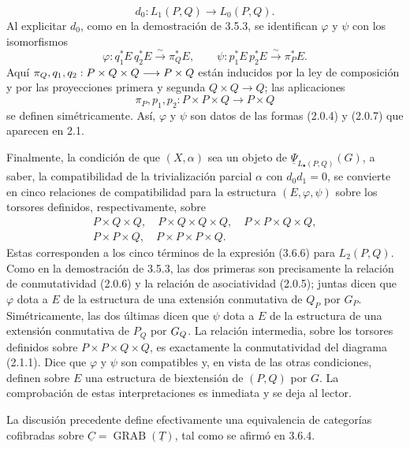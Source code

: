 
\[
 d_0:L_1(P,Q)\longrightarrow L_0(P,Q).
\]
Al explicitar $d_0$, como en la demostración de 3.5.3, se identifican
$\varphi$ y $\psi$ con los isomorfismos
\[
 \varphi:q_1^*E\,q_2^*E\xrightarrow{\sim}\pi_Q^*E,
 \qquad
 \psi:p_1^*E\,p_2^*E\xrightarrow{\sim}\pi_P^*E.
\]
Aquí $\pi_Q,\sisi{q_1q_2}{q_1,q_2}:P\times Q\times Q
\longrightarrow\sisi{Q}{P\times Q}$ están inducidos por la ley de
composición y por las proyecciones primera y segunda
$Q\times Q\longrightarrow Q$; las aplicaciones
\[
 \pi_P,p_1,p_2:P\times P\times Q\longrightarrow P\times Q
\]
se definen simétricamente. Así, $\varphi$ y $\psi$ son datos de las formas
(2.0.4) y (2.0.7) que aparecen en 2.1.

Finalmente, la condición de que $(X,\alpha)$ sea un objeto de
$\underline\Psi_{L_\bullet(P,Q)}(G)$, a saber, la compatibilidad de la
trivialización parcial $\alpha$ con $d_0d_1=0$, se convierte en cinco
relaciones de compatibilidad para la estructura $(E,\varphi,\psi)$ sobre
los torsores definidos, respectivamente, sobre
\[
\begin{gathered}
 P\times Q\times Q,\quad
 P\times Q\times Q\times Q,\quad
 P\times P\times Q\times Q,\\
 P\times P\times Q,\quad
 P\times P\times P\times Q.
\end{gathered}
\]
Estas corresponden a los cinco términos de la expresión (3.6.6) para
$L_2(P,Q)$. Como en la demostración de 3.5.3, las dos primeras son
precisamente la relación de conmutatividad (2.0.6) y la relación de
asociatividad (2.0.5); juntas dicen que $\varphi$ dota a $E$ de la
estructura de una extensión conmutativa de $Q_P$ por $G_P$.
Simétricamente, las dos últimas dicen que $\psi$ dota a $E$ de la
estructura de una extensión conmutativa de $P_Q$ por
$\sisi{G_P}{G_Q}$. La relación intermedia, sobre los torsores definidos
sobre $P\times P\times Q\times Q$, es exactamente la conmutatividad del
diagrama (2.1.1). Dice que $\varphi$ y $\psi$ son compatibles y, en vista
de las otras condiciones, definen sobre $E$ una estructura de biextensión
de $(P,Q)$ por $G$. La comprobación de estas interpretaciones es inmediata
y se deja al lector.


La discusión precedente define efectivamente una equivalencia de
categorías cofibradas sobre
$\underline C=\operatorname{GRAB}(\underline T)$, tal como se afirmó en
3.6.4.

